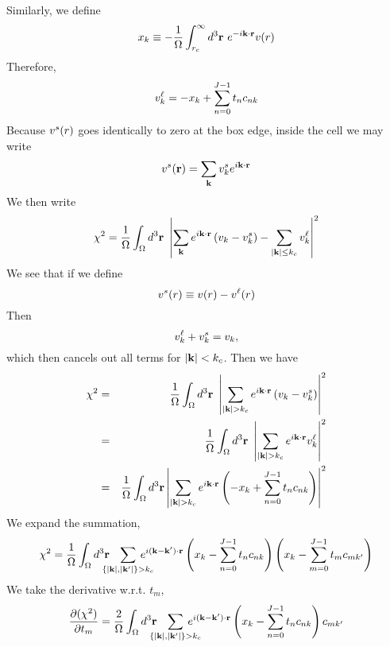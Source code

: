 \documentclass{article}
\begin{document}
Similarly, we define
\begin{equation}
x_k \equiv -\frac{1}{\Omega} \int_{r_c}^\infty d^3\mathbf{r} \ e^{-i\mathbf{k}\cdot\mathbf{r}} v(r)
\end{equation}
Therefore,
\begin{equation}
v^\ell_k = -x_k + \sum_{n=0}^{J-1} t_n c_{nk} 
\end{equation}
Because $v^s(r)$ goes identically to zero at the box edge, inside the
cell we may write
\begin{equation}
v^s(\mathbf{r}) = \sum_{\mathbf{k}} v^s_k e^{i\mathbf{k} \cdot \mathbf{r}}
\end{equation}
We then write
\begin{equation}
\chi^2 = \frac{1}{\Omega} \int_\Omega d^3 \vr \ 
\left| \sum_\vk e^{i\vk \cdot \vr} \left(v_k - \vs_k \right)
-\sum_{|\vk| \le k_c} \vl_k \right|^2
\end{equation}
We see that if we define
\begin{equation}
v^s(r) \equiv v(r) - v^\ell(r)
\end{equation}
Then
\begin{equation}
v^\ell_k + v^s_k = v_k,
\end{equation}
which then cancels out all terms for $|\mathbf{k}| < k_c$.  Then we have
\begin{eqnarray}
\chi^2 & = & \frac{1}{\Omega} \int_\Omega d^3 \vr \ 
\left|\sum_{|\vk|>k_c} e^{i\vk\cdot\vr} 
\left(v_k -\vs_k \right)\right|^2 \\
& = & \frac{1}{\Omega} \int_\Omega d^3 \vr \ 
\left|\sum_{|\vk|>k_c} e^{i\vk\cdot\vr} \vl_k \right|^2 \\ 
& = & 
\frac{1}{\Omega} \int_\Omega d^3 \vr
\left|\sum_{|\vk|>k_c} e^{i\vk\cdot\vr}\left( -x_k + \sum_{n=0}^{J-1} t_n
c_{nk}\right) \right|^2
\end{eqnarray}
We expand the summation,
\newcommand{\ns}{\negthickspace}
\begin{equation}
\chi^2 = \frac{1}{\Omega} \int_\Omega d^3 \vr \ns \ns \ns
\sum_{\{|\vk|,|\vk'|\}>k_c} \ns\ns\ns\ns\ns
 e^{i(\vk-\vk')\cdot \vr}
\left(x_k -\sum_{n=0}^{J-1} t_n c_{nk} \right)
\left(x_k -\sum_{m=0}^{J-1} t_{m} c_{mk'} \right)
\end{equation}
We take the derivative w.r.t. $t_{m}$,
\begin{equation}
\frac{\partial (\chi^2)}{\partial t_{m}} =
\frac{2}{\Omega}\int_\Omega d^3 \vr \ns \ns \ns
\sum_{\{|\vk|,|\vk'|\}>k_c} \ns\ns\ns\ns\ns
 e^{i(\vk-\vk')\cdot \vr}
\left(x_k -\sum_{n=0}^{J-1} t_n c_{nk} \right) c_{mk'}
\end{equation}
\end{document}

